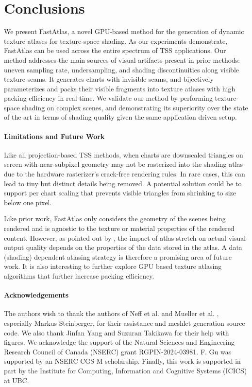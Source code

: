 \section{Conclusions}

We present FastAtlas, a novel GPU-based method for the generation of dynamic texture atlases for texture-space shading. As our experiments demonstrate, FastAtlas can be used across the entire spectrum of TSS applications. Our method addresses the main sources of visual artifacts present in prior methods: uneven sampling rate, undersampling, and shading discontinuities along visible texture seams. It generates charts with invisible seams, and bijectively parameterizes and packs their visible fragments into texture atlases with high packing efficiency in real time. We validate our method by performing texture-space shading on complex scenes, and demonstrating its superiority over the state of the art in terms of shading quality given the same application driven setup. 

\paragraph*{Limitations and Future Work} Like all projection-based TSS methods, when charts are downscaled triangles on screen with near-subpixel geometry may not be rasterized into the shading atlas due to the hardware rasterizer's crack-free rendering rules. In rare cases, this can lead to tiny but distinct details being removed. A potential solution could be to support per chart scaling that prevents visible triangles from shrinking to size below one pixel.

Like prior work, FastAtlas only considers the geometry of the scenes being rendered and is agnostic to the texture or material properties of the rendered content. However, as pointed out by \cite{sander2002signal}, the impact of atlas stretch on actual visual output quality depends on the properties of the data stored in the atlas. A data (shading) dependent atlasing strategy is therefore a promising area of future work. It is also interesting to further explore GPU based texture atlasing algorithms that further increase packing efficiency.

\paragraph*{Acknowledgements} The authors wish to thank the authors of Neff et al.  and Mueller et al. , especially Markus Steinberger, for their assistance and meshlet generation source code. We also thank Jinfan Yang and Suzuran Takikawa for their help with figures. We acknowledge the support of the Natural Sciences and Engineering Research Council of Canada (NSERC) grant RGPIN-2024-03981. F. Gu was supported by an NSERC CGS-M scholarship. Finally, this work is supported in part by the Institute for Computing, Information and Cognitive Systems (ICICS) at UBC.
